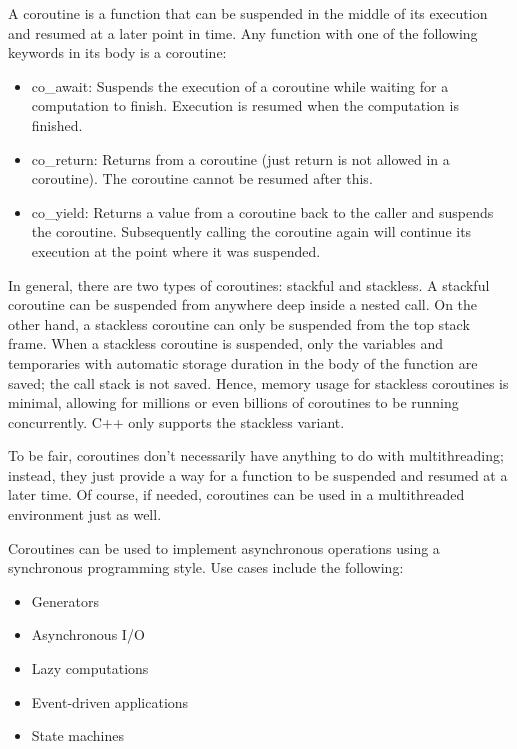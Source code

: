 A coroutine is a function that can be suspended in the middle of its execution and resumed at a later point in time. Any function with one of the following keywords in its body is a coroutine:

\begin{itemize}
\item
co\_await: Suspends the execution of a coroutine while waiting for a computation to finish. Execution is resumed when the computation is finished.

\item
co\_return: Returns from a coroutine (just return is not allowed in a coroutine). The coroutine cannot be resumed after this.

\item
co\_yield: Returns a value from a coroutine back to the caller and suspends the coroutine. Subsequently calling the coroutine again will continue its execution at the point where it was suspended.
\end{itemize}

In general, there are two types of coroutines: stackful and stackless. A stackful coroutine can be suspended from anywhere deep inside a nested call. On the other hand, a stackless coroutine can only be suspended from the top stack frame. When a stackless coroutine is suspended, only the variables and temporaries with automatic storage duration in the body of the function are saved; the call stack is not saved. Hence, memory usage for stackless coroutines is minimal, allowing for millions or even billions of coroutines to be running concurrently. C++ only supports the stackless variant.

To be fair, coroutines don’t necessarily have anything to do with multithreading; instead, they just provide a way for a function to be suspended and resumed at a later time. Of course, if needed, coroutines can be used in a multithreaded environment just as well.

Coroutines can be used to implement asynchronous operations using a synchronous programming style. Use cases include the following:

\begin{itemize}
\item
Generators

\item
Asynchronous I/O

\item
Lazy computations

\item
Event-driven applications

\item
State machines
\end{itemize}

